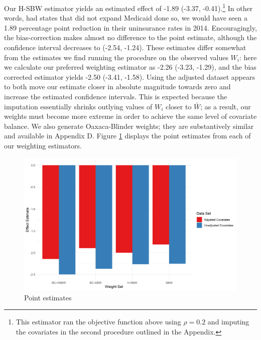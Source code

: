 \documentclass[12pt]{article}
\begin{document}
Our H-SBW estimator yields an estimated effect of -1.89 (-3.37, -0.41).\footnote{This estimator ran the objective function above using $\rho = 0.2$ and imputing the covariates in the second procedure outlined in the Appendix.} In other words, had states that did not expand Medicaid done so, we would have seen a 1.89 percentage point reduction in their uninsurance rates in 2014. Encouragingly, the bias-correction makes almost no difference to the point estimate, although the confidence interval decreases to (-2.54, -1.24). These estimates differ somewhat from the estimates we find running the procedure on the observed values $W_i$: here we calculate our preferred weighting estimator as -2.26 (-3.23, -1.29), and the bias corrected estimator yields -2.50 (-3.41, -1.58). Using the adjusted dataset appears to both move our estimate closer in absolute magnitude towards zero and increase the estimated confidence intervals. This is expected because the imputation essentially shrinks outlying values of $W_i$ closer to $\bar{W}$; as a result, our weights must become more extreme in order to achieve the same level of covariate balance. We also generate Oaxaca-Blinder weights; they are substantively similar and available in Appendix D. Figure \ref{estimators} displays the point estimates from each of our weighting estimators. 

\begin{figure}[B]
\begin{center}
    \includegraphics[scale=0.6]{01_Plots/point-estimates-c1.png}
    \caption{Point estimates}
    \label{estimators}
\end{center}
\end{figure}
\end{document}

